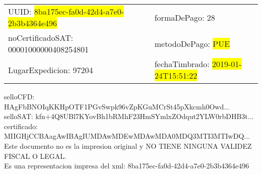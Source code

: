 \documentclass{article}
\begin{document}
\begin{tabular}{p{11cm}p{1cm}p{8cm}}
\bigskip
UUID: \colorbox{yellow}{ 8ba175ec-fa0d-42d4-a7e0-2b3b4364e496 } & & formaDePago: 28\\

noCertificadoSAT: 00001000000408254801 & & metodoDePago: \colorbox{yellow}{ PUE }\\

LugarExpedicion: 97204 & & fechaTimbrado: \colorbox{yellow}{ 2019-01-24T15:51:22 } \\
\end{tabular}

\bigskip
selloCFD: HAgFbBNOIqKKHpOTF1PGvSwpk96vZpKGuMCrSt45pXkcmh0Owd... \\
selloSAT: kfn+4Q8UBl7KYovBh1bRMhF23HmSYmlxZOdqut2YLW0rbDHB3t... \\

certificado: MIIGHjCCBAagAwIBAgIUMDAwMDEwMDAwMDA0MDQ3MTI3MTIwDQ...\bigskip\bigskip\bigskip\bigskip\bigskip\bigskip
\\Este documento no es la impresion original y NO TIENE NINGUNA VALIDEZ FISCAL O LEGAL. \\
 Es una representacion impresa del xml:  8ba175ec-fa0d-42d4-a7e0-2b3b4364e496 \\
\end{document}
